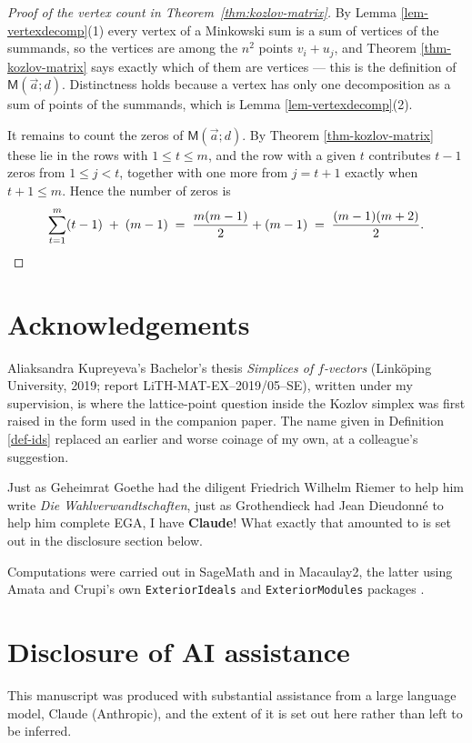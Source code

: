 \documentclass[11pt, a4paper, abstract=yes]{scrartcl}
\theoremstyle{definition}
\theoremstyle{remark}
\theoremstyle{plain}
\newcommand{\extten}{\mathsf{M}}
\begin{document}
\begin{proof}[Proof of the vertex count in Theorem~\ref{thm:kozlov-matrix}]
By Lemma \ref{lem-vertexdecomp}(1) every vertex of a Minkowski sum is a sum of vertices of the summands,
so the vertices are among the \(n^2\) points \(v_i+u_j\), and
Theorem \ref{thm-kozlov-matrix} says exactly which of them are vertices --- this is the definition of
\(\extten(\vec a;d)\). Distinctness holds because a vertex has only one decomposition as a sum of
points of the summands, which is Lemma \ref{lem-vertexdecomp}(2).

It remains to count the zeros of \(\extten(\vec a;d)\). By Theorem \ref{thm-kozlov-matrix} these lie in
the rows with \(1\le t\le m\), and the row with a given \(t\) contributes \(t-1\) zeros from
\(1\le j<t\), together with one more from \(j=t+1\) exactly when \(t+1\le m\). Hence the number of
zeros is
\begin{equation}\label{eq:gapK-6}
  \sum_{t=1}^{m}(t-1)\;+\;(m-1)\;=\;\frac{m(m-1)}{2}+(m-1)\;=\;\frac{(m-1)(m+2)}{2}. \qedhere
\end{equation}
\end{proof}
\section*{Acknowledgements}
\label{sec:org010d1c8}
Aliaksandra Kupreyeva's Bachelor's thesis \emph{Simplices of \(f\)-vectors} (Linköping University, 2019;
report LiTH-MAT-EX--2019/05--SE), written under my supervision, is where the lattice-point question
inside the Kozlov simplex was first raised in the form used in the companion paper. The name given in
Definition \ref{def-ids} replaced an earlier and worse coinage of my own, at a colleague's suggestion.

Just as Geheimrat Goethe had the diligent Friedrich Wilhelm Riemer to help him write \emph{Die
Wahlverwandtschaften}, just as Grothendieck had Jean Dieudonné to help him complete EGA, I have
\textbf{Claude}! What exactly that amounted to is set out in the disclosure section below.

Computations were carried out in SageMath and in Macaulay2, the latter using
Amata and Crupi's own \texttt{ExteriorIdeals} and \texttt{ExteriorModules} packages
\autocite{SageMath,Macaulay2,AmataCrupi2018ExteriorIdeals,AmataCrupi2021}.
\section*{Disclosure of AI assistance}
\label{sec:orgc7a6c2c}
This manuscript was produced with substantial assistance from a large language model, Claude
(Anthropic), and the extent of it is set out here rather than left to be inferred.
\end{document}
